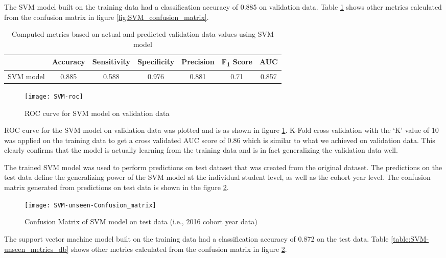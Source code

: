 \documentclass[11pt,openright]{report}
\begin{document}
The SVM model built on the training data had a classification accuracy of 0.885 on validation data. Table \ref{table:SVM_confusion_matrix} shows other metrics calculated from the confusion matrix in figure \ref{fig:SVM_confusion_matrix}. 
\begin{table} [!htb]
	\renewcommand{\arraystretch}{1.3}
	\caption{Computed metrics based on actual and predicted validation data values using SVM model}
	\label{table:SVM_confusion_matrix}
	\centering
	\begin{tabular}{|c|c|c|c|c|c|c|}
    \hline
  	 & \bfseries Accuracy & \bfseries Sensitivity & \bfseries Specificity & \bfseries Precision & \bfseries F\textsubscript{1} Score  & \bfseries AUC\\  
    \hline
	SVM model & 0.885 & 0.588 & 0.976 & 0.881 & 0.71 & 0.857 \\ \hline
	\end{tabular} 
\end{table}

 \begin{figure}[!htb]
	\centering
	\texttt{[image: SVM-roc]}
	\caption{ROC curve for SVM model on validation data}
	\label{fig:SVM_roc}
\end{figure} 

ROC curve for the SVM model on validation data was plotted and is as shown in figure \ref{fig:SVM_roc}. K-Fold cross validation with the `K' value of 10 was applied on the training data to get a cross validated AUC score of 0.86 which is similar to what we achieved on validation data. This clearly confirms that the model is actually learning from the training data and is in fact generalizing the validation data well.

The trained SVM model was used to perform predictions on test dataset that was created from the original dataset. The predictions on the test data define the generalizing power of the SVM model at the individual student level, as well as the cohort year level. The confusion matrix generated from predictions on test data is shown in the figure \ref{fig:SVM_unseen_confusion_matrix}.

  \begin{figure}[!htb]
	\centering
	\texttt{[image: SVM-unseen-Confusion\_matrix]}
	\caption{Confusion Matrix of SVM model on test data (i.e., 2016 cohort year data)}
	\label{fig:SVM_unseen_confusion_matrix}
\end{figure} 

The support vector machine model built on the training data had a classification accuracy of 0.872 on the test data. Table \ref{table:SVM-unseen_metrics_db} shows other metrics calculated from the confusion matrix in figure \ref{fig:SVM_unseen_confusion_matrix}.
\end{document}
